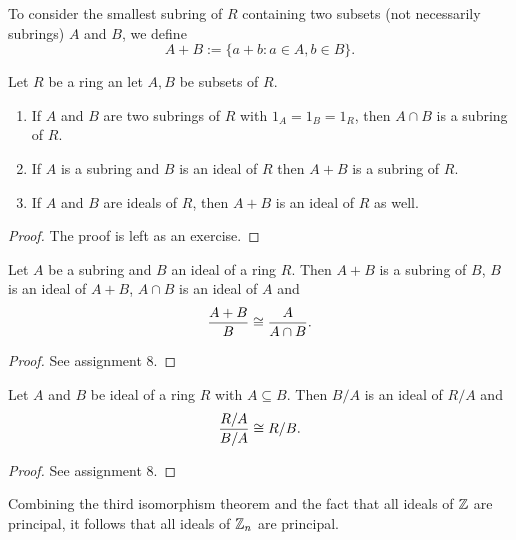 \documentclass[11pt]{article}
\begin{document}
\begin{definition}
    To consider the smallest subring of $R$ containing two subsets (not necessarily subrings) $A$ and $B$, we define
    \[A+B:=\{a+b:a\in A,b\in B\}.\]
\end{definition}

\begin{proposition}
    Let $R$ be a ring an let $A,B$ be subsets of $R$.
    \begin{enumerate}
        \item If $A$ and $B$ are two subrings of $R$ with $1_A=1_B=1_R$, then $A\cap B$ is a subring of $R$.
        \item If $A$ is a subring and $B$ is an ideal of $R$ then $A+B$ is a subring of $R$.
        \item If $A$ and $B$ are ideals of $R$, then $A+B$ is an ideal of $R$ as well.
    \end{enumerate}
\end{proposition}

\begin{proof}
    The proof is left as an exercise.
\end{proof}

\begin{theorem}
    Let $A$ be a subring and $B$ an ideal of a ring $R$. Then $A+B$ is a subring of $B$, $B$ is an ideal of $A+B$, $A\cap B$ is an ideal of $A$ and
    \[\frac{A+B}{B}\cong\frac{A}{A\cap B}.\]
\end{theorem}

\begin{proof}
    See assignment 8.
\end{proof}

\begin{theorem}
    Let $A$ and $B$ be ideal of a ring $R$ with $A\subseteq B$. Then $B/A$ is an ideal of $R/A$ and
    \[\frac{R/A}{B/A}\cong R/B.\]
\end{theorem}

\begin{proof}
    See assignment 8.
\end{proof}

\begin{example}
    Combining the third isomorphism theorem and the fact that all ideals of $\mathbb{Z}$ are principal, it follows that all ideals of $\mathbb{Z}_n$ are principal.
\end{example}
\end{document}
